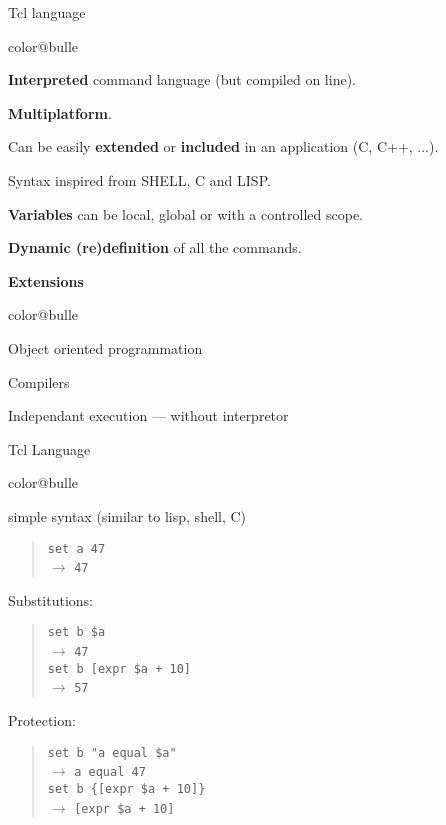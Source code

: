 \documentclass[a4paper,landscape,smooth]{show}
\newcommand{\tclex}[2]{\texttt{#1}\\$\rightarrow$ \texttt{#2}}
\begin{document}

\begin{tslide}{ Tcl language}
   \vfill
   \begin{bitemize}{color@bulle}
      \item {\bf Interpreted} command language (but compiled on line).
      \item {\bf Multiplatform}.
      \item Can be easily {\bf extended} or {\bf included} in an application (C, C++, ...).
      \item Syntax inspired from SHELL, C and LISP.
      \item {\bf Variables}  can be local, global or with a controlled scope.
      \item {\bf Dynamic (re)definition} of all the commands.
   \end{bitemize}

   \vfill
   {\bf Extensions}
   \begin{bitemize}{color@bulle}
      \item Object oriented programmation
      \item Compilers
      \item Independant execution --- without interpretor
   \end{bitemize}
   \vfill
\end{tslide}


\begin{tslide}{Tcl Language}
   \vfill
   \begin{bitemize}{color@bulle}

      \item simple syntax (similar to lisp, shell, C)
	 \begin{quote}
	    \tclex{set a 47}{47}
	 \end{quote}

      \item Substitutions:
        \begin{quote}
	   \tclex{set b \$a}{47}\\
	   \tclex{set b [expr \$a + 10]}{57}
        \end{quote}

      \item Protection:
        \begin{quote}
	  \tclex{set b "{}a equal \$a"}{a equal 47}\\
	  \tclex{set b \{[expr \$a + 10]\}}{[expr \$a + 10]}
        \end{quote}
      \end{bitemize}
   \vfill
\end{tslide}
\end{document}
